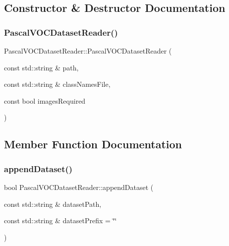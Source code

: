 \subsection{Constructor \& Destructor Documentation}
\mbox{\label{class_pascal_v_o_c_dataset_reader_ae0a8634aa9fbd308e6c1a1ecb60a7c89}} 
\subsubsection{\texorpdfstring{Pascal\+V\+O\+C\+Dataset\+Reader()}{PascalVOCDatasetReader()}}
{\footnotesize\ttfamily Pascal\+V\+O\+C\+Dataset\+Reader\+::\+Pascal\+V\+O\+C\+Dataset\+Reader (\begin{DoxyParamCaption}\item[{const std\+::string \&}]{path,  }\item[{const std\+::string \&}]{class\+Names\+File,  }\item[{const bool}]{images\+Required }\end{DoxyParamCaption})}



\subsection{Member Function Documentation}
\mbox{\label{class_pascal_v_o_c_dataset_reader_a845b70b47078741f29d8e348c3c48467}} 
\subsubsection{\texorpdfstring{append\+Dataset()}{appendDataset()}}
{\footnotesize\ttfamily bool Pascal\+V\+O\+C\+Dataset\+Reader\+::append\+Dataset (\begin{DoxyParamCaption}\item[{const std\+::string \&}]{dataset\+Path,  }\item[{const std\+::string \&}]{dataset\+Prefix = {\ttfamily \char`\"{}\char`\"{}} }\end{DoxyParamCaption})\hspace{0.3cm}{\ttfamily [virtual]}}



